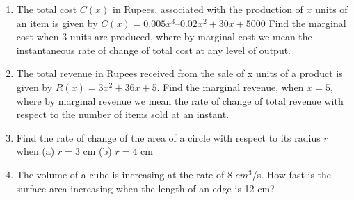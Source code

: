 \begin{enumerate}[label=\arabic*.,ref=\thesubsection.\theenumi]
\item The total cost $C(x)$ in Rupees, associated with the production of $x$ units of an item is given by
$C(x) = 0.005 x^3 – 0.02 x^2 + 30x + 5000$
Find the marginal cost when 3 units are produced, where by marginal cost we mean the instantaneous rate of change of total cost at any level of output.
\item The total revenue in Rupees received from the sale of x units of a product is given by $R(x) = 3x^2
+ 36x + 5$. Find the marginal revenue, when $x = 5$, where by marginal revenue we mean the rate of change of total revenue with respect to the number of items sold at an instant.
\item Find the rate of change of the area of a circle with respect to its radius $r$ when (a) $r = 3$ cm
(b) $r = 4$ cm
\item  The volume of a cube is increasing at the rate of 8 $cm^3$/s. How fast is the surface area increasing when the length of an edge is 12 cm?


\end{enumerate}
